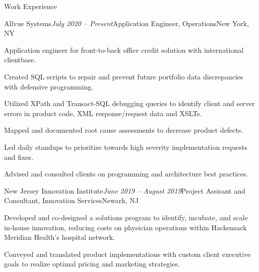\documentclass[letterpaper]{resume} %
\begin{document}
\begin{rSection}{Work Experience}

\begin{rSubsection}{Allvue Systems}{\em July 2020 -- Present}{Application Engineer, Operations}{New York, NY}
	\item Application engineer for front-to-back office credit solution with international clientbase.
	\item Created SQL scripts to repair and prevent future portfolio data discrepancies with defensive programming.
	\item Utilized XPath and Transact-SQL debugging queries to identify client and server errors in product code, XML response/request data and XSLTs.
	\item Mapped and documented root cause assessments to decrease product defects.
	\item Led daily standups to prioritize towards high severity implementation requests and fixes.
	\item Advised and consulted clients on programming and architecture best practices.
\end{rSubsection}

\begin{rSubsection}{New Jersey Innovation Institute}{\em June 2019 -- August 2019}{Project Assisant and Consultant, Innovation Services}{Newark, NJ}
	\item Developed and co-designed a solutions program to identify, incubate, and scale in-house innovation, reducing costs on physician operations within Hackensack Meridian Health’s hospital network.
	\item Conveyed and translated product implementations with custom client executive goals to realize optimal pricing and marketing strategies.
 
\end{rSubsection}

\end{rSection}
\end{document}
